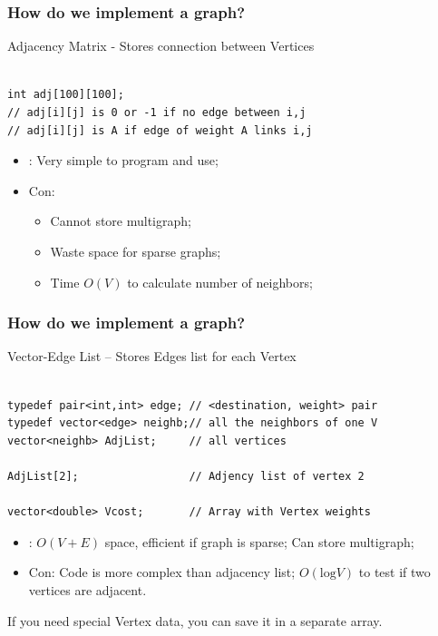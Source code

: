\documentclass{beamer}
\begin{document}
\begin{frame}[fragile]
  \frametitle{How do we implement a graph?}
{\smaller
  \begin{block}{Adjacency Matrix - Stores connection between Vertices}
\begin{verbatim}

int adj[100][100];
// adj[i][j] is 0 or -1 if no edge between i,j
// adj[i][j] is A if edge of weight A links i,j
\end{verbatim}

    \begin{itemize}
    \item {}: Very simple to program and use;
    \item \alert{Con}:
      \begin{itemize}
      \item Cannot store multigraph;
      \item Waste space for sparse graphs;
      \item Time $O(V)$ to calculate number of neighbors;
      \end{itemize}
    \end{itemize}
  \end{block}
  }
\end{frame}

\begin{frame}[fragile]
  \frametitle{How do we implement a graph?}

  {\smaller
  \begin{block}{Vector-Edge List -- Stores Edges list for each Vertex}
\begin{verbatim}

typedef pair<int,int> edge; // <destination, weight> pair
typedef vector<edge> neighb;// all the neighbors of one V
vector<neighb> AdjList;     // all vertices

AdjList[2];                 // Adjency list of vertex 2

vector<double> Vcost;       // Array with Vertex weights
\end{verbatim}

    \begin{itemize}
    \item {}: $O(V+E)$ space, efficient if graph is sparse; Can store multigraph; 
    \item \alert{Con}: Code is more complex than adjacency list; $O(\text{log}V)$
      to test if two vertices are adjacent.
    \end{itemize}

    \bigskip

    If you need special Vertex data, you can save it in a separate array.
  \end{block}

  }
\end{frame}
\end{document}
